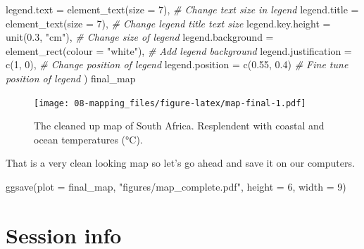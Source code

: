 \documentclass[
]{book}
\newenvironment{Shaded}{\begin{snugshade}}{\end{snugshade}}
\newcommand{\AttributeTok}[1]{\textcolor[rgb]{0.77,0.63,0.00}{#1}}
\newcommand{\CommentTok}[1]{\textcolor[rgb]{0.56,0.35,0.01}{\textit{#1}}}
\newcommand{\DecValTok}[1]{\textcolor[rgb]{0.00,0.00,0.81}{#1}}
\newcommand{\FloatTok}[1]{\textcolor[rgb]{0.00,0.00,0.81}{#1}}
\newcommand{\FunctionTok}[1]{\textcolor[rgb]{0.00,0.00,0.00}{#1}}
\newcommand{\NormalTok}[1]{#1}
\newcommand{\SpecialCharTok}[1]{\textcolor[rgb]{0.00,0.00,0.00}{#1}}
\newcommand{\StringTok}[1]{\textcolor[rgb]{0.31,0.60,0.02}{#1}}
\begin{document}
\begin{Shaded}
\begin{Highlighting}[]
        \AttributeTok{legend.text =} \FunctionTok{element\_text}\NormalTok{(}\AttributeTok{size =} \DecValTok{7}\NormalTok{), }\CommentTok{\# Change text size in legend}
        \AttributeTok{legend.title =} \FunctionTok{element\_text}\NormalTok{(}\AttributeTok{size =} \DecValTok{7}\NormalTok{), }\CommentTok{\# Change legend title text size}
        \AttributeTok{legend.key.height =} \FunctionTok{unit}\NormalTok{(}\FloatTok{0.3}\NormalTok{, }\StringTok{"cm"}\NormalTok{), }\CommentTok{\# Change size of legend}
        \AttributeTok{legend.background =} \FunctionTok{element\_rect}\NormalTok{(}\AttributeTok{colour =} \StringTok{"white"}\NormalTok{), }\CommentTok{\# Add legend background}
        \AttributeTok{legend.justification =} \FunctionTok{c}\NormalTok{(}\DecValTok{1}\NormalTok{, }\DecValTok{0}\NormalTok{), }\CommentTok{\# Change position of legend}
        \AttributeTok{legend.position =} \FunctionTok{c}\NormalTok{(}\FloatTok{0.55}\NormalTok{, }\FloatTok{0.4}\NormalTok{) }\CommentTok{\# Fine tune position of legend}
\NormalTok{        )}
\NormalTok{final\_map}
\end{Highlighting}
\end{Shaded}

\begin{figure}
\centering
\texttt{[image: 08-mapping\_files/figure-latex/map-final-1.pdf]}
\caption{\label{fig:map-final}The cleaned up map of South Africa. Resplendent with coastal and ocean temperatures (°C).}
\end{figure}

That is a very clean looking map so let's go ahead and save it on our computers.

\begin{Shaded}
\begin{Highlighting}[]
\FunctionTok{ggsave}\NormalTok{(}\AttributeTok{plot =}\NormalTok{ final\_map, }\StringTok{"figures/map\_complete.pdf"}\NormalTok{, }\AttributeTok{height =} \DecValTok{6}\NormalTok{, }\AttributeTok{width =} \DecValTok{9}\NormalTok{)}
\end{Highlighting}
\end{Shaded}

\hypertarget{session-info-6}{%
\section{Session info}\label{session-info-6}}

\begin{Shaded}
\end{Shaded}
\end{document}
